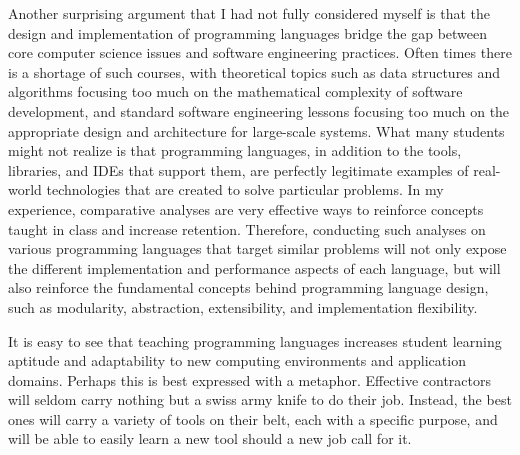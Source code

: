\documentclass[12pt,letterpaper]{article}
\begin{document}
Another surprising argument that I had not fully considered myself is that the design and implementation of programming languages bridge the gap between core computer science issues and software engineering practices. Often times there is a shortage of such courses, with theoretical topics such as data structures and algorithms focusing too much on the mathematical complexity of software development, and standard software engineering lessons focusing too much on the appropriate design and architecture for large-scale systems. What many students might not realize is that programming languages, in addition to the tools, libraries, and IDEs that support them, are perfectly legitimate examples of real-world technologies that are created to solve particular problems. In my experience, comparative analyses are very effective ways to reinforce concepts taught in class and increase retention. Therefore, conducting such analyses on various programming languages that target similar problems will not only expose the different implementation and performance aspects of each language, but will also reinforce the fundamental concepts behind programming language design, such as modularity, abstraction, extensibility, and implementation flexibility.

It is easy to see that teaching programming languages increases student learning aptitude and adaptability to new computing environments and application domains. Perhaps this is best expressed with a metaphor. Effective contractors will seldom carry nothing but a swiss army knife to do their job. Instead, the best ones will carry a variety of tools on their belt, each with a specific purpose, and will be able to easily learn a new tool should a new job call for it.




\end{document}
